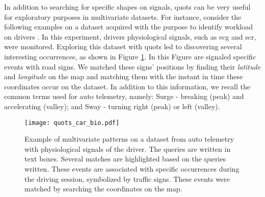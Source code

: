 \par
In addition to searching for specific shapes on signals, \gls{quots} can be very useful for exploratory purposes in multivariate datasets. For instance, consider the following examples on a dataset acquired with the purpose to identify workload on drivers \cite{hci_car_dataset}. In this experiment, drivers physiological signals, such as \gls{ecg} and \gls{scr}, were monitored. Exploring this dataset with \gls{quots} led to discovering several interesting occurrences, as shown in Figure \ref{fig:quots_car_physio}. In this Figure are signaled specific events with road signs. We matched these signs' positions by finding their \textit{latitude} and \textit{longitude} on the map and matching them with the instant in time these coordinates occur on the dataset. In addition to this information, we recall the common terms used for auto telemetry, namely: Surge - breaking (peak) and accelerating (valley); and Sway - turning right (peak) or left (valley).

\begin{figure}[h]
\centering
\texttt{[image: quots\_car\_bio.pdf]}
\caption{Example of multivariate patterns on a dataset from auto telemetry with physiological signals of the driver. The queries are written in text boxes. Several matches are highlighted based on the queries written. These events are associated with specific occurrences during the driving session, symbolized by traffic signs. These events were matched by searching the coordinates on the map. \cite{hcilab}}
\label{fig:quots_car_physio}
\end{figure}

